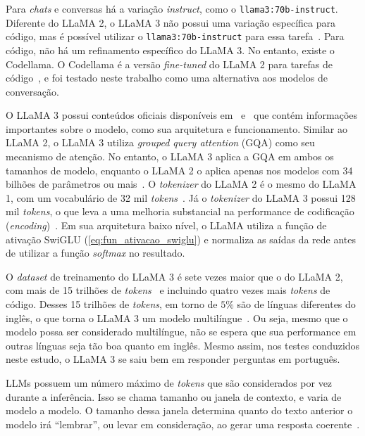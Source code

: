 \documentclass[journal]{IEEEtran}
\begin{document}
Para \textit{chats} e conversas há a variação \textit{instruct}, como o \texttt{llama3:70b-instruct}.
Diferente do LLaMA 2, o LLaMA 3 não possui uma variação específica para código, mas é possível utilizar o \texttt{llama3:70b-instruct} para essa tarefa~\cite{touvron2023llama2,meta2024llama3}.
Para código, não há um refinamento específico do LLaMA 3.
No entanto, existe o Codellama.
O Codellama é a versão \textit{fine-tuned} do LLaMA 2 para tarefas de código~\cite{roziere2023code}, e foi testado neste trabalho como uma alternativa aos modelos de conversação.

O LLaMA 3 possui conteúdos oficiais disponíveis em~\cite{meta2024llama3} e~\cite{llama3modelcard} que contém informações importantes sobre o modelo, como sua arquitetura e funcionamento.
Similar ao LLaMA 2, o LLaMA 3 utiliza \textit{grouped query attention} (GQA) como seu mecanismo de atenção.
No entanto, o LLaMA 3 aplica a GQA em ambos os tamanhos de modelo, enquanto o LLaMA 2 o aplica apenas nos modelos com 34 bilhões de parâmetros ou mais~\cite{meta2024llama3,touvron2023llama2}.
O \textit{tokenizer} do LLaMA 2 é o mesmo do LLaMA 1, com um vocabulário de 32 mil \textit{tokens}~\cite{touvron2023llama2}.
Já o \textit{tokenizer} do LLaMA 3 possui 128 mil \textit{tokens}, o que leva a uma melhoria substancial na performance de codificação (\textit{encoding})~\cite{meta2024llama3}.
Em sua arquitetura baixo nível, o LLaMA utiliza a função de ativação SwiGLU (\autoref{eq:fun_ativacao_swiglu}) e normaliza as saídas da rede antes de utilizar a função \textit{softmax} no resultado.

O \textit{dataset} de treinamento do LLaMA 3 é sete vezes maior que o do LLaMA 2, com mais de 15 trilhões de \textit{tokens}~\cite{meta2024llama3} e incluindo quatro vezes mais \textit{tokens} de código.
Desses 15 trilhões de \textit{tokens}, em torno de $5\%$ são de línguas diferentes do inglês, o que torna o LLaMA 3 um modelo multilíngue~\cite{meta2024llama3}.
Ou seja, mesmo que o modelo possa ser considerado multilíngue, não se espera que sua performance em outras línguas seja tão boa quanto em inglês.
Mesmo assim, nos testes conduzidos neste estudo, o LLaMA 3 se saiu bem em responder perguntas em português.

LLMs possuem um número máximo de \textit{tokens} que são considerados por vez durante a inferência.
Isso se chama tamanho ou janela de contexto, e varia de modelo a modelo.
O tamanho dessa janela determina quanto do texto anterior o modelo irá ``lembrar'', ou levar em consideração, ao gerar uma resposta coerente~\cite{vaswani2017attention,devlin2018bert,brown2020language}.
\end{document}
